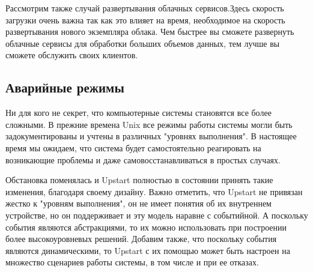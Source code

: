 Рассмотрим также случай развертывания облачных сервисов.Здесь скорость загрузки очень важна так как это влияет на время, необходимое на скорость развертывания нового экземпляра облака. Чем быстрее вы сможете развернуть облачные сервисы для обработки больших объемов данных, тем лучше вы сможете обслужить своих клиентов.
\subsection{Аварийные режимы}
Ни для кого не секрет, что компьютерные системы становятся все более сложными. В прежние времена Unix все режимы работы системы могли быть задокументированы и учтены в различных "уровнях выполнения". В настоящее время мы ожидаем, что система будет самостоятельно реагировать на возникающие проблемы и даже самовосстанавливаться в простых случаях.

Обстановка поменялась и Upstart полностью в состоянии принять такие изменения, благодаря своему дизайну. Важно отметить, что Upstart не привязан жестко к "уровням выполнения", он не имеет понятия об их внутреннем устройстве, но он поддерживает и эту модель наравне с событийной. А поскольку события являются абстракциями, то их можно использовать при построении более высокоуровневых решений. Добавим также, что поскольку события являются динамическими, то Upstart с их помощью может быть настроен на множество сценариев работы системы, в том числе и при ее отказах.